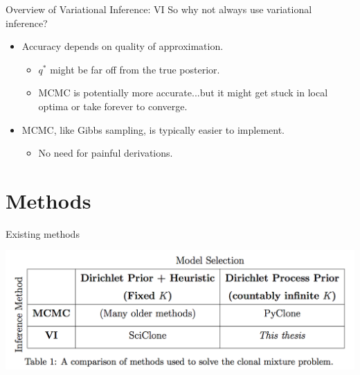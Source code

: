 \documentclass{beamer}
\begin{document}
\begin{frame}{Overview of Variational Inference: VI}
So why not always use variational inference? \vspace{0.1in}
\begin{itemize}
\setlength\itemsep{1em}
	\item<2-> Accuracy depends on quality of approximation.
		\begin{itemize}
			\setlength\itemsep{0.25em}
			\setlength\topsep{0.5em}
			\item<3-> $q^*$ might be far off from the true posterior.
			\item<4-> MCMC is potentially more accurate...but it might get stuck in local optima or take forever to converge.
		\end{itemize}
	\item<5-> MCMC, like Gibbs sampling, is typically easier to implement.
		\begin{itemize}
			\item<6-> No need for painful derivations.
		\end{itemize}		
\end{itemize}
\end{frame}

\section{Methods}
\begin{frame}{Existing methods}
\centerline{\includegraphics[scale=0.55]{images/methodstable.png}}
\end{frame}
\end{document}
